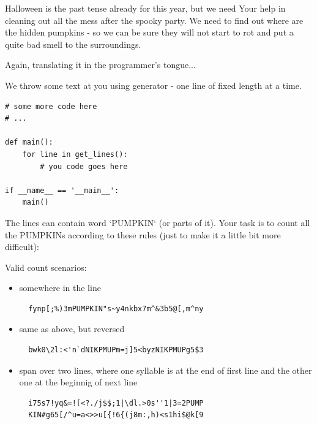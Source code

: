 \documentclass[12pt]{article}
\begin{document}
\vspace{1cm}
\begin{flushleft}

Halloween is the past tense already for this year, but we need Your help in cleaning out all the mess after the spooky party. We need to find out where are the hidden pumpkins - so we can be sure they will not start to rot and put a quite bad smell to the surroundings.

Again, translating it in the programmer's tongue...

We throw some text at you using generator - one line of fixed length at a time.

\begin{verbatim}
# some more code here
# ...

def main():
    for line in get_lines():
        # you code goes here

if __name__ == '__main__':
    main()
\end{verbatim}
\vspace{0.5cm}

The lines can contain word `PUMPKIN` (or parts of it). Your task is to count all the PUMPKINs according to these rules (just to make it a little bit more difficult):

\vspace{0.5cm}
Valid count scenarios:

\begin{itemize}
  \item somewhere in the line
  \begin{verbatim}
  fynp[;%)3mPUMPKIN"s~y4nkbx7m^&3b5@[,m^ny
  \end{verbatim}
  \item same as above, but reversed
  \begin{verbatim}
  bwk0\2l:<'n`dNIKPMUPm=j]5<byzNIKPMUPg5$3
  \end{verbatim}
  \item span over two lines, where one syllable is at the end of first line and the other one at the beginnig of next line
  \begin{verbatim}
  i75s7!yq&=![<?./j$$;1|\dl.>0s''1|3=2PUMP
  KIN#g65[/^u=a<>>u[{!6{(j8m:,h)<s1hi$@k[9
  \end{verbatim}
\end{itemize}


\end{flushleft}
\end{document}
